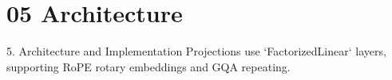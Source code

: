\section{05 Architecture}

 5. Architecture and Implementation
Projections use `FactorizedLinear` layers, supporting RoPE rotary embeddings and GQA repeating.
